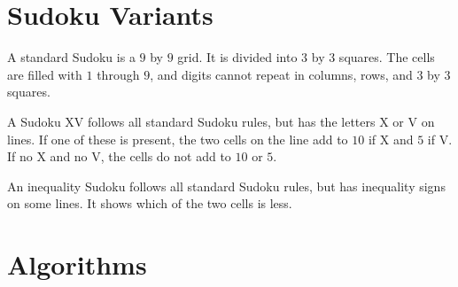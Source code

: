 \documentclass{article}
\begin{document}
\section{Sudoku Variants}

A standard Sudoku is a $9$ by $9$ grid. It is divided into $3$ by $3$ squares. The cells are filled with $1$ through $9$, and digits cannot repeat in columns, rows, and $3$ by $3$ squares. 

A Sudoku XV follows all standard Sudoku rules, but has the letters X or V on lines. If one of these is present, the two cells on the line add to $10$ if X and $5$ if V. If no X and no V, the cells do not add to $10$ or $5$. 

An inequality Sudoku follows all standard Sudoku rules, but has inequality signs on some lines. It shows which of the two cells is less.

\section{Algorithms}
\end{document}
